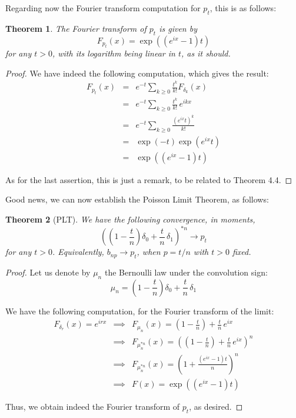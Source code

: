 \documentclass[12pt]{amsbook}
\newtheorem{theorem}{Theorem}[chapter]
\begin{document}
Regarding now the Fourier transform computation for $p_t$, this is as follows:


\begin{theorem}
The Fourier transform of $p_t$ is given by
$$F_{p_t}(x)=\exp\left((e^{ix}-1)t\right)$$
for any $t>0$, with its logarithm being linear in $t$, as it should.
\end{theorem}

\begin{proof}
We have indeed the following computation, which gives the result:
\begin{eqnarray*}
F_{p_t}(x)
&=&e^{-t}\sum_{k\geq0}\frac{t^k}{k!}F_{\delta_k}(x)\\
&=&e^{-t}\sum_{k\geq0}\frac{t^k}{k!}\,e^{ikx}\\
&=&e^{-t}\sum_{k\geq0}\frac{(e^{ix}t)^k}{k!}\\
&=&\exp(-t)\exp(e^{ix}t)\\
&=&\exp\left((e^{ix}-1)t\right)
\end{eqnarray*}

As for the last assertion, this is just a remark, to be related to Theorem 4.4.
\end{proof}

Good news, we can now establish the Poisson Limit Theorem, as follows:


\begin{theorem}[PLT]
We have the following convergence, in moments,
$$\left(\left(1-\frac{t}{n}\right)\delta_0+\frac{t}{n}\,\delta_1\right)^{*n}\to p_t$$
for any $t>0$. Equivalently, $b_{np}\to p_t$, when $p=t/n$ with $t>0$ fixed.
\end{theorem}

\begin{proof}
Let us denote by $\mu_n$ the Bernoulli law under the convolution sign:
$$\mu_n=\left(1-\frac{t}{n}\right)\delta_0+\frac{t}{n}\,\delta_1$$

We have the following computation, for the Fourier transform of the limit: 
\begin{eqnarray*}
F_{\delta_r}(x)=e^{irx}
&\implies&F_{\mu_n}(x)=\left(1-\frac{t}{n}\right)+\frac{t}{n}\,e^{ix}\\
&\implies&F_{\mu_n^{*n}}(x)=\left(\left(1-\frac{t}{n}\right)+\frac{t}{n}\,e^{ix}\right)^n\\
&\implies&F_{\mu_n^{*n}}(x)=\left(1+\frac{(e^{ix}-1)t}{n}\right)^n\\
&\implies&F(x)=\exp\left((e^{ix}-1)t\right)
\end{eqnarray*}

Thus, we obtain indeed the Fourier transform of $p_t$, as desired.
\end{proof}
\end{document}
